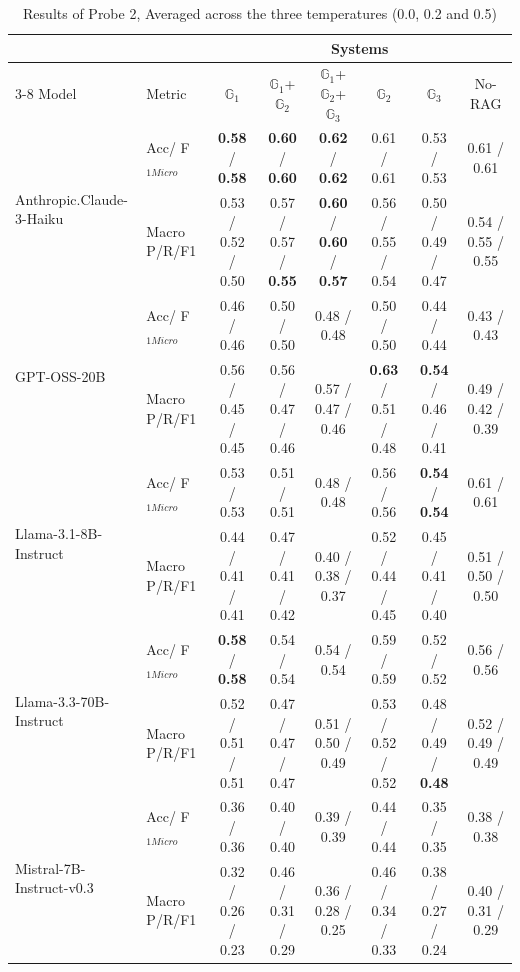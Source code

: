 \begin{table}[ht] 
\centering 
\caption{Results of Probe 2, Averaged across the three temperatures (0.0, 0.2 and 0.5)}
\label{tab:probe2} 
\scriptsize 
\begin{tabular}{l l c c c c c c}
\hline
\multicolumn{2}{c}{} & \multicolumn{6}{c}{Systems} \\
\cline{3-8}
Model & Metric & $\mathbb{G}_1$ & $\mathbb{G}_1$+$\mathbb{G}_2$ & $\mathbb{G}_1$+$\mathbb{G}_2$+$\mathbb{G}_3$ & $\mathbb{G}_2$ & $\mathbb{G}_3$ & No-RAG \\
\hline
\multirow{2}{*}{Anthropic.Claude-3-Haiku} & Acc/ F$_{1Micro}$ & \textbf{0.58} / \textbf{0.58} & \textbf{0.60} / \textbf{0.60} & \textbf{0.62} / \textbf{0.62} & 0.61 / 0.61 & 0.53 / 0.53 & 0.61 / 0.61 \\
& Macro P/R/F1 & 0.53 / 0.52 / 0.50 & 0.57 / 0.57 / \textbf{0.55} & \textbf{0.60} / \textbf{0.60} / \textbf{0.57} & 0.56 / 0.55 / 0.54 & 0.50 / 0.49 / 0.47 & 0.54 / 0.55 / 0.55 \\
\hline
\multirow{2}{*}{GPT-OSS-20B} & Acc/ F$_{1Micro}$ & 0.46 / 0.46 & 0.50 / 0.50 & 0.48 / 0.48 & 0.50 / 0.50 & 0.44 / 0.44 & 0.43 / 0.43 \\
& Macro P/R/F1 & 0.56 / 0.45 / 0.45 & 0.56 / 0.47 / 0.46 & 0.57 / 0.47 / 0.46 & \textbf{0.63} / 0.51 / 0.48 & \textbf{0.54} / 0.46 / 0.41 & 0.49 / 0.42 / 0.39 \\
\hline
\multirow{2}{*}{Llama-3.1-8B-Instruct} & Acc/ F$_{1Micro}$ & 0.53 / 0.53 & 0.51 / 0.51 & 0.48 / 0.48 & 0.56 / 0.56 & \textbf{0.54} / \textbf{0.54} & 0.61 / 0.61 \\
& Macro P/R/F1 & 0.44 / 0.41 / 0.41 & 0.47 / 0.41 / 0.42 & 0.40 / 0.38 / 0.37 & 0.52 / 0.44 / 0.45 & 0.45 / 0.41 / 0.40 & 0.51 / 0.50 / 0.50 \\
\hline
\multirow{2}{*}{Llama-3.3-70B-Instruct} & Acc/ F$_{1Micro}$ & \textbf{0.58} / \textbf{0.58} & 0.54 / 0.54 & 0.54 / 0.54 & 0.59 / 0.59 & 0.52 / 0.52 & 0.56 / 0.56 \\
& Macro P/R/F1 & 0.52 / 0.51 / 0.51 & 0.47 / 0.47 / 0.47 & 0.51 / 0.50 / 0.49 & 0.53 / 0.52 / 0.52 & 0.48 / 0.49 / \textbf{0.48} & 0.52 / 0.49 / 0.49 \\
\hline
\multirow{2}{*}{Mistral-7B-Instruct-v0.3} & Acc/ F$_{1Micro}$ & 0.36 / 0.36 & 0.40 / 0.40 & 0.39 / 0.39 & 0.44 / 0.44 & 0.35 / 0.35 & 0.38 / 0.38 \\
& Macro P/R/F1 & 0.32 / 0.26 / 0.23 & 0.46 / 0.31 / 0.29 & 0.36 / 0.28 / 0.25 & 0.46 / 0.34 / 0.33 & 0.38 / 0.27 / 0.24 & 0.40 / 0.31 / 0.29 \\

\end{tabular}
\end{table}
